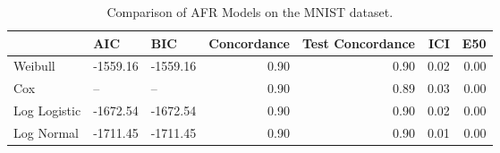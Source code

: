 \begin{table*}
\centering
\caption{Comparison of AFR Models on the MNIST dataset.}
\label{tab:mnist}
\begin{tabular}{lllrrrr}
\toprule
 & AIC & BIC & Concordance & Test Concordance & ICI & E50 \\
\midrule
Weibull & -1559.16 & -1559.16 & 0.90 & 0.90 & 0.02 & 0.00 \\
Cox & -- & -- & 0.90 & 0.89 & 0.03 & 0.00 \\
Log Logistic & -1672.54 & -1672.54 & 0.90 & 0.90 & 0.02 & 0.00 \\
Log Normal & -1711.45 & -1711.45 & 0.90 & 0.90 & 0.01 & 0.00 \\
\bottomrule
\end{tabular}
\end{table*}
